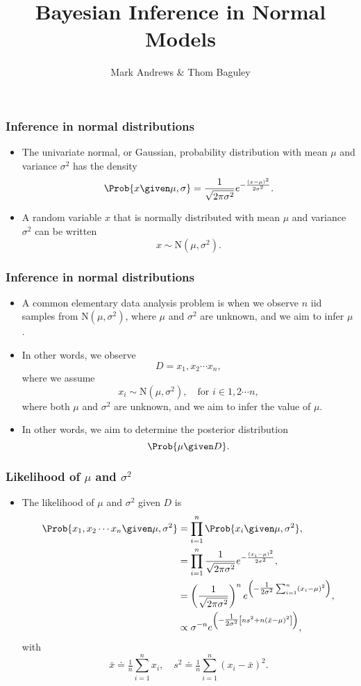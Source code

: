 \documentclass{slides}
\title[Bayesian Inference]{Bayesian Inference in Normal Models}
\author[Andrews]{Mark Andrews \& Thom Baguley}
\date{}
\begin{document}
{
	\begin{frame}
		\titlepage
	\end{frame}
}


\begin{frame}
	\frametitle{Inference in normal distributions}
	\begin{itemize}
		\item The univariate normal, or Gaussian, probability distribution with mean $\mu$ and variance $\sigma^2$ has the density
			\[
				\Prob{x\given\mu,\sigma} = \frac{1}{\sqrt{2\pi\sigma^2}}e^{-\frac{(x-\mu)^2}{2\sigma^2}}.
			\]
		\item A random variable $x$ that is normally distributed with mean $\mu$ and variance $\sigma^2$ can be written
			\[
				x \sim \textrm{N}(\mu, \sigma^2).
			\]

	\end{itemize}
\end{frame}

\begin{frame}
	\frametitle{Inference in normal distributions}
	\begin{itemize}
		\item A common elementary data analysis problem is when we
			observe $n$ iid samples from $\textrm{N}(\mu, \sigma^2)$, where
			$\mu$ and $\sigma^2$ are unknown, and we aim to infer
			$\mu$.

		\item In other words, we observe
			\[D = x_1, x_2 \cdots x_n,\]
			where we assume
			\[x_i \sim \textrm{N}(\mu, \sigma^2),\quad\text{for $i \in 1,2\cdots n$},\]
		      where both $\mu$ and $\sigma^2$ are unknown, and we aim to infer the value of $\mu$. 
		\item In other words, we aim to determine the posterior distribution
		      \[
			\Prob{\mu \given D}.
		      \]
	\end{itemize}
\end{frame}


\begin{frame}
	\frametitle{Likelihood of $\mu$ and $\sigma^2$}
	\begin{itemize}
		\item The likelihood of $\mu$ and $\sigma^2$ given $D$ is 
			\begin{align*}
				\Prob{x_1, x_2 \cdots x_n \given \mu, \sigma^2} &= \prod_{i=1}^n \Prob{x_i \given \mu, \sigma^2},\\
				&= \prod_{i=1}^n \frac{1}{\sqrt{2\pi\sigma^2}}e^{-\frac{(x_i-\mu)^2}{2\sigma^2}},\\
				&= \left(\frac{1}{\sqrt{2\pi\sigma^2}}\right)^n e^{\left(-\tfrac{1}{2\sigma^2}\sum_{i=1}^{n}(x_i - \mu)^2\right)},\\
				&\propto \sigma^{-n} e^{\left( -\tfrac{1}{2\sigma^2}\left[n s^2 + n(\bar{x}-\mu)^2\right] \right)},
			\end{align*}
			with \[
				\bar{x} \doteq \tfrac{1}{n} \sum_{i=1}^n x_i, \quad s^2 \doteq \tfrac{1}{n} \sum_{i=1}^n (x_i - \bar{x})^2.
			\]
	\end{itemize}

\end{frame}
\end{document}
